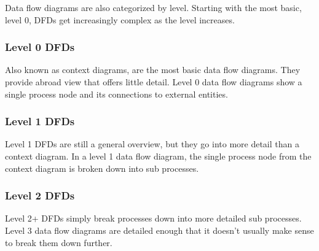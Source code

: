 \documentclass[11pt]{article}
\begin{document}
Data flow diagrams are also categorized by level. Starting with the most basic, level 0, DFDs get
increasingly complex as the level increases.

\subsubsection{Level 0 DFDs}
Also known as context diagrams, are the most basic data flow diagrams. They provide abroad view that offers little detail. Level 0 data flow diagrams show a single process node and its
connections to external entities.

\subsubsection{Level 1 DFDs}
Level 1 DFDs are still a general overview, but they go into more detail than a context diagram. In a level
1 data flow diagram, the single process node from the context diagram is broken down into sub
processes.

\subsubsection{Level 2 DFDs}
Level 2+ DFDs simply break processes down into more detailed sub processes. Level 3 data flow
diagrams are detailed enough that it doesn't usually make sense to break them down further.
\end{document}
